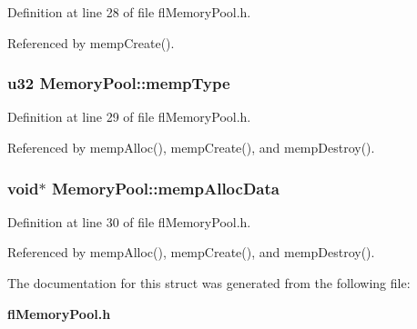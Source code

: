 Definition at line 28 of file fl\-Memory\-Pool.h.

Referenced by memp\-Create().
\subsubsection{\setlength{\rightskip}{0pt plus 5cm}u32 {\bf Memory\-Pool::memp\-Type}}\label{structMemoryPool_4e4c005bec738993879dd0efa9f7425b}




Definition at line 29 of file fl\-Memory\-Pool.h.

Referenced by memp\-Alloc(), memp\-Create(), and memp\-Destroy().
\subsubsection{\setlength{\rightskip}{0pt plus 5cm}void$\ast$ {\bf Memory\-Pool::memp\-Alloc\-Data}}\label{structMemoryPool_e7f426ba6f51850784be228c01081e60}




Definition at line 30 of file fl\-Memory\-Pool.h.

Referenced by memp\-Alloc(), memp\-Create(), and memp\-Destroy().

The documentation for this struct was generated from the following file:\begin{CompactItemize}
\item 
{\bf fl\-Memory\-Pool.h}\end{CompactItemize}
